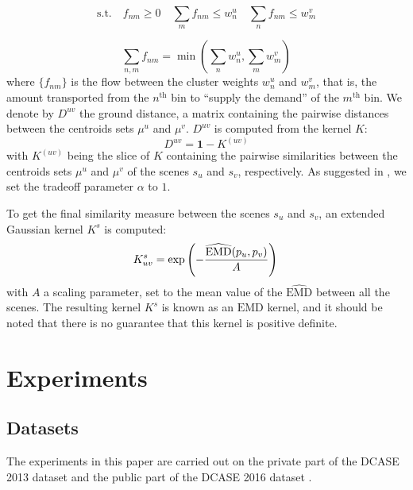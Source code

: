 \documentclass[journal]{IEEEtran}
\newcommand*{\EMD}{\mathrm{EMD}}
\newcommand{\ja}[1]{\textcolor{magenta}{Joakim : #1}}
\begin{document}
\begin{equation*}
\mathrm{s.t.} \quad f_{nm}\geq0 \quad \sum\limits_{m} f_{nm} \leq w_n^u \quad \sum\limits_{n} f_{nm} \leq w_m^v
\end{equation*}

\begin{equation*}
\sum\limits_{n,m}f_{nm} = \min\left( \sum\limits_{n} w_n^u ,\sum\limits_{m} w_m^v \right)
\end{equation*} 
where $\lbrace f_{nm} \rbrace$ is the flow between the cluster weights $w_n^u$ and $w_m^v$, that is, the amount transported from the $n^{\textrm{th}}$ bin to ``supply the demand'' of the $m^\textrm{th}$ bin. We denote by $D^{uv}$ the ground distance, a matrix containing the pairwise distances between the centroids sets $\mu^u$ and $\mu^v$. $D^{uv}$ is computed from the kernel $K$:
\begin{equation*}
D^{uv}=\boldsymbol{1}-K^{(uv)}
\end{equation*}
with $K^{(uv)}$ being the slice of $K$ containing the pairwise similarities between the centroids sets $\mu^u$ and $\mu^v$ of the scenes $s_u$ and $s_v$, respectively. As suggested in \cite{pele2009fast}, we set the tradeoff parameter $\alpha$ to $1$.

To get the final similarity measure between the scenes $s_u$ and $s_v$, an extended Gaussian kernel $K^s$ \cite{chapelle1999support,jing2003support} is computed:
\begin{equation}
\label{eq:ks}
K_{uv}^s = \exp\left( - \dfrac{\widehat{\EMD}(p_u,p_v)}{A} \right) \\
\end{equation}
with $A$ a scaling parameter, set to the mean value of the $\widehat{\EMD}$ between all the scenes. The resulting kernel $K^s$ is known as an $\EMD$ kernel, and it should be noted that there is no guarantee that this kernel is positive definite.

\section{Experiments}
\label{sec:experiments}

\subsection{Datasets}

The experiments in this paper are carried out on the private part of the DCASE 2013 dataset\cite{giannoulis2013database, 7100934} and the public part of the DCASE 2016 dataset \cite{Mesaros2016_EUSIPCO}.
\end{document}
